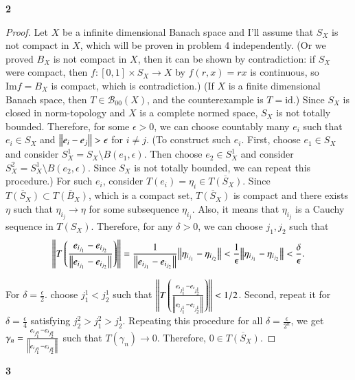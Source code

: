 \documentclass[a4paper, 12pt]{article}
\theoremstyle{Mydefinition}
\theoremstyle{Mytheorem}
\begin{document}
\noindent \textbf{2}

\begin{proof}
Let $X$ be a infinite dimensional Banach space and I'll assume that $S_X$ is not compact in $X$, which will be proven in problem 4 independently. (Or we proved $B_X$ is not compact in $X$, then it can be shown by contradiction: if $S_X$ were compact, then $f:[0,1]\times S_X\rightarrow X$ by $f(r,x) = rx$ is continuous, so $\textrm{Im} f = B_X$ is compact, which is contradiction.) (If $X$ is a finite dimensional Banach space, then $T\in \mathcal{B}_{00}(X)$, and the counterexample is $T=\textrm{id}$.) Since $S_X$ is closed in norm-topology and $X$ is a complete normed space, $S_X$ is not totally bounded. Therefore, for some $\epsilon>0$, we can choose countably many $e_i$ such that $e_i\in S_X$ and $\norm{e_i-e_j}>\epsilon$ for $i\neq j$. (To construct such $e_i$. First, choose $e_1\in S_X$ and consider $S^1_X = S_X\setminus B(e_1, \epsilon)$. Then choose $e_2\in S^1_X$ and consider $S^2_X = S^1_X\setminus B(e_2, \epsilon)$. Since $S_X$ is not totally bounded, we can repeat this procedure.) For such $e_i$, consider $T(e_i) = \eta_i \in \overline{T(S_X)}$. Since $\overline{T(S_X)}\subset \overline{T(B_X)}$, which is a compact set, $\overline{T(S_X)}$ is compact and there exists $\eta$ such that $\eta_{i_j}\rightarrow \eta$ for some subsequence $\eta_{i_j}$. Also, it means that $\eta_{i_j}$ is a Cauchy sequence in $T(S_X)$. Therefore, for any $\delta>0$, we can choose $j_1, j_2$ such that
\begin{equation}
    \norm{T\left(\frac{e_{i_{j_1}}-e_{i_{j_2}}}{\norm{e_{i_{j_1}}-e_{i_{j_2}}}}\right)} = \frac{1}{\norm{e_{i_{j_1}}-e_{i_{j_2}}}}\norm{\eta_{i_{j_1}}-\eta_{i_{j_2}}}<\frac{1}{\epsilon}\norm{\eta_{i_{j_1}}-\eta_{i_{j_2}}}<\frac{\delta}{\epsilon}.
\end{equation}

For $\delta=\frac{\epsilon}{2}$. choose $j^1_1<j^1_2$ such that $\norm{T\left(\frac{e_{i_{j^1_1}}-e_{i_{j^1_2}}}{\norm{e_{i_{j^1_1}}-e_{i_{j^1_2}}}}\right)}<1/2$. Second, repeat it for $\delta = \frac{\epsilon}{4}$ satisfying $j^2_2>j^2_1 > j^1_2$. Repeating this procedure for all $\delta = \frac{\epsilon}{2^n}$, we get $\gamma_n = \frac{e_{i_{j^n_1}}-e_{i_{j^n_2}}}{\norm{e_{i_{j^n_1}}-e_{i_{j^n_2}}}}$ such that $T(\gamma_n)\rightarrow 0$. Therefore, $0\in \overline{T(S_X)}$.
\end{proof}

\noindent \textbf{3}
\end{document}
